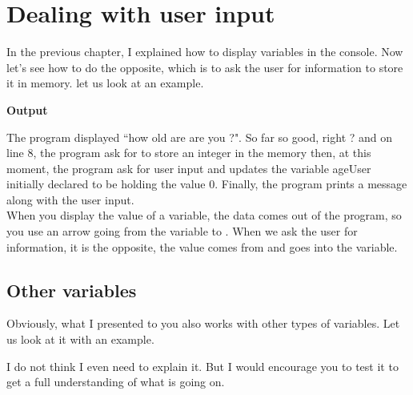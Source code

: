 \documentclass[11pt, a4paper]{article}
\begin{document}
\section{Dealing with user input}
In the previous chapter, I explained how to display variables in the console.
Now let’s see how to do the opposite, which is to ask the user for information
to store it in memory. let us look at an example.

\textbf{Output}

The program displayed ``how old are are you ?". So far so good, right ? and on line 8,
the program ask for to store an integer in the memory then, at this moment, the program
ask for user input and updates the variable ageUser initially declared to be holding the
value 0. Finally, the program prints a message along with the user input.\\
When you display the value of a variable, the data comes out of the program,
so you use an arrow going from the variable to . When we ask the user
for information, it is the opposite, the value comes from  and goes into the variable.

\subsection{Other variables}
Obviously, what I presented to you also works with other types of variables.
Let us look at it with an example.

I do not think I even need to explain it. But I would encourage you to test
it to get a full understanding of what is going on.
\end{document}
